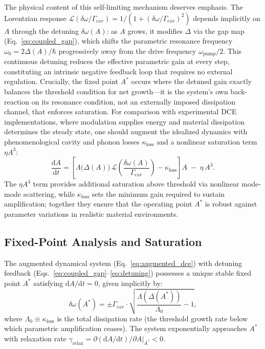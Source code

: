 \documentclass[11pt,letterpaper]{article}
\begin{document}
The physical content of this self-limiting mechanism deserves emphasis. The Lorentzian response $\mathcal{L}(\delta\omega/\Gamma_{\text{cav}}) = 1/(1 + (\delta\omega/\Gamma_{\text{cav}})^2)$ depends implicitly on $A$ through the detuning $\delta\omega(A)$: as $A$ grows, it modifies $\Delta$ via the gap map (Eq.~\ref{eq:coupled_gap}), which shifts the parametric resonance frequency $\omega_0 = 2\Delta(A)/\hbar$ progressively away from the drive frequency $\omega_{\text{pump}}/2$. This continuous detuning reduces the effective parametric gain at every step, constituting an intrinsic negative feedback loop that requires no external regulation. Crucially, the fixed point $A^*$ occurs where the detuned gain exactly balances the threshold condition for net growth---it is the system's own back-reaction on its resonance condition, not an externally imposed dissipation channel, that enforces saturation. For comparison with experimental DCE implementations\cite{Wilson2011,Jaskula2012}, where modulation supplies energy and material dissipation determines the steady state, one should augment the idealized dynamics with phenomenological cavity and phonon losses $\kappa_{\text{loss}}$ and a nonlinear saturation term $\eta A^3$:
\begin{equation}
\frac{\mathrm{d}A}{\mathrm{d}t} = \left[\Lambda\bigl(\Delta(A)\bigr)\,\mathcal{L}\!\left(\frac{\delta\omega(A)}{\Gamma_{\text{cav}}}\right) - \kappa_{\text{loss}}\right] A \;-\; \eta\, A^3.
\label{eq:augmented_dce}
\end{equation}
The $\eta A^3$ term provides additional saturation above threshold via nonlinear mode-mode scattering, while $\kappa_{\text{loss}}$ sets the minimum gain required to sustain amplification; together they ensure that the operating point $A^*$ is robust against parameter variations in realistic material environments.

\subsection{Fixed-Point Analysis and Saturation}

\begin{theorem}
The augmented dynamical system (Eq.~\ref{eq:augmented_dce}) with detuning feedback (Eqs.~\ref{eq:coupled_gap}--\ref{eq:detuning}) possesses a unique stable fixed point $A^*$ satisfying $\mathrm{d}A/\mathrm{d}t = 0$, given implicitly by:
\begin{equation}
\boxed{\delta\omega(A^*) = \pm \Gamma_{\text{cav}} \cdot \sqrt{\frac{\Lambda(\Delta(A^*))}{\Lambda_0} - 1},}
\label{eq:fixed_point}
\end{equation}
where $\Lambda_0 \equiv \kappa_{\text{loss}}$ is the total dissipation rate (the threshold growth rate below which parametric amplification ceases). The system exponentially approaches $A^*$ with relaxation rate $\gamma_{\text{relax}} = \partial(\mathrm{d}A/\mathrm{d}t)/\partial A |_{A^*} < 0$.
\end{theorem}
\end{document}
